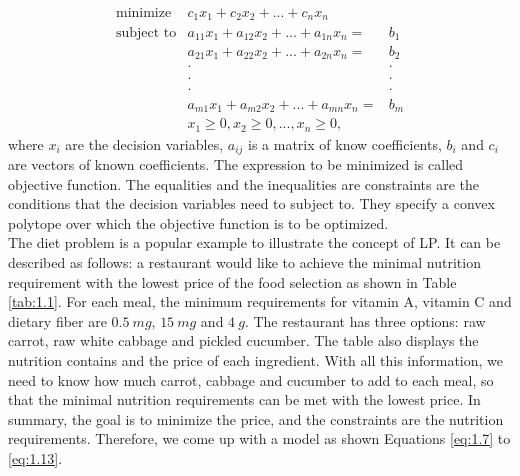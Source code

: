 \begin{eqnarray}  \label{eq:1.6}
 \text{minimize} & c_{1}x_{1} + c_{2}x_{2} + ... + c_{n} x_{n}  \nonumber \\
 \text{subject to} & a_{11} x_{1} + a_{12} x_{2}+ ... + a_{1n} x_{n} = & b_{1} \nonumber \\
& a_{21} x_{1} + a_{22} x_{2} + ... + a_{2n} x_{n} = & b_{2} \nonumber \\
&\cdot                                    &\cdot \nonumber \\
&\cdot                                    &\cdot \nonumber \\
&\cdot                                    &\cdot \nonumber \\
& a_{m1} x_{1} + a_{m2} x_{2} + ... + a_{mn} x_{n} = & b_{m} \nonumber \\
& x_{1} \geq 0, x_{2} \geq 0, ... ,x_{n} \geq 0, 
\end{eqnarray} 
where $x_{i}$ are the decision variables, $a_{ij}$ is a matrix of know coefficients,  $b_{i}$ and $c_{i}$ are vectors of known coefficients. The expression to be minimized is called objective function. The equalities and the inequalities are constraints are the conditions that the decision variables need to subject to. They specify a convex polytope over which the objective function is to be optimized. \\

The diet problem is a popular example to illustrate the concept of LP. It can be described as follows: a restaurant would like to achieve the minimal nutrition requirement with the lowest price of the food selection as shown in Table \ref{tab:1.1}. For each meal, the minimum requirements for vitamin A, vitamin C and dietary fiber are $0.5~mg$, $15~mg$ and $4~g$. The restaurant has three options: raw carrot, raw white cabbage and pickled cucumber. The table also displays the nutrition contains and the price of each ingredient. With all this information, we need to know how much carrot, cabbage and cucumber to add to each meal, so that the minimal nutrition requirements can be met with the lowest price. In summary, the goal is to minimize the price, and the constraints are the nutrition requirements. Therefore, we come up with a model as shown Equations \ref{eq:1.7} to \ref{eq:1.13}.

